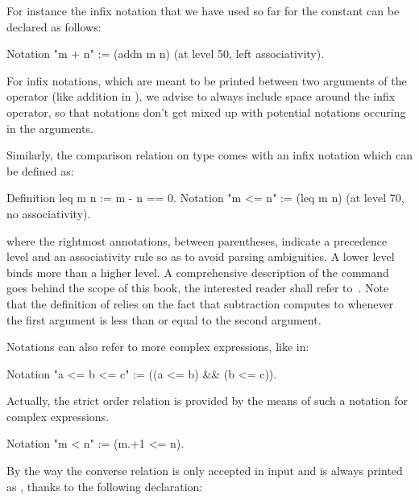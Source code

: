 For instance the infix notation that we have used so far for the
constant  can be declared as follows:

\begin{coq}{}{}
Notation "m + n" := (addn m n) (at level 50, left associativity).
\end{coq}

For infix notations, which are meant to be printed between two arguments
of the operator (like addition in ), we advise to always include
space around the infix operator, so that notations don't get mixed up with
potential notations occuring in the arguments.


Similarly, the comparison relation  on type  comes with
an infix notation \C{<=} which can be defined as:

\begin{coq}{}{}
Definition leq m n := m - n == 0.
Notation "m <= n" := (leq m n) (at level 70, no associativity).
\end{coq}

where the rightmost annotations, between parentheses, indicate a
precedence level and an associativity rule so as to avoid parsing
ambiguities. A lower level binds more than a higher level. A comprehensive
description of the  command goes behind the scope of this
book, the interested reader shall refer to~\cite[Chapter 12]{Coq:manual}.
Note that the definition of  relies on the fact that
subtraction computes to  whenever the first argument is less than
or equal to the second argument.

Notations can also refer to more complex expressions, like in:

\begin{coq}{}{}
Notation "a <= b <= c" := ((a <= b) && (b <= c)).
\end{coq}

Actually, the strict order relation is provided by the means of such a
notation for complex expressions.

\begin{coq}{}{}
Notation "m < n"  := (m.+1 <= n).
\end{coq}


By the way the converse relation  is only accepted in input
and is always printed as  , thanks to the following declaration:

